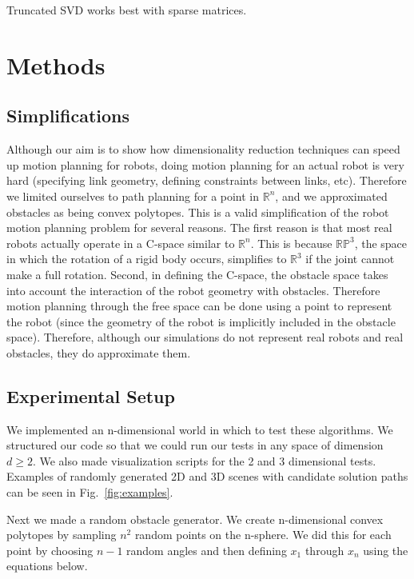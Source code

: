 \documentclass[12pt]{article}
\begin{document}
Truncated SVD works best with sparse matrices.

\section{Methods}

\subsection{Simplifications}

Although our aim is to show how dimensionality reduction techniques can speed
up motion planning for robots, doing motion planning for an actual robot is
very hard (specifying link geometry, defining constraints between links, etc).
Therefore we limited ourselves to path planning for a point in $\mathbb{R}^n$,
and we approximated obstacles as being convex polytopes. This is a valid
simplification of the robot motion planning problem for several reasons. The
first reason is that most real robots actually operate in a C-space similar to
$\mathbb{R}^n$. This is because $\mathbb{RP}^3$, the space in which the
rotation of a rigid body occurs, simplifies to $\mathbb{R}^3$ if the joint
cannot make a full rotation. Second, in defining the C-space, the obstacle
space takes into account the interaction of the robot geometry with obstacles.
Therefore motion planning through the free space can be done using a point to
represent the robot (since the geometry of the robot is implicitly included in
the obstacle space). Therefore, although our simulations do not represent real
robots and real obstacles, they do approximate them.

\subsection{Experimental Setup}

We implemented an n-dimensional world in which to test these algorithms. We
structured our code so that we could run our tests in any space of dimension $d
\geq 2$. We also made visualization scripts for the 2 and 3 dimensional tests.
Examples of randomly generated 2D and 3D scenes with candidate solution paths
can be seen in Fig.~\ref{fig:examples}.

Next we made a random obstacle generator. We create n-dimensional convex
polytopes by sampling $n^{2}$ random points on the n-sphere. We did this for
each point by choosing $n-1$ random angles and then defining $x_1$ through
$x_n$ using the equations below.
\end{document}
